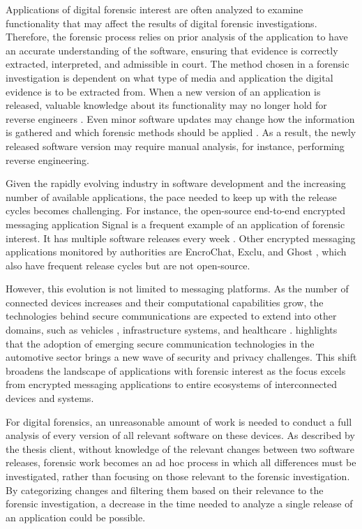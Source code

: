 Applications of digital forensic interest are often analyzed to examine functionality that may affect the results of digital forensic investigations. Therefore, the forensic process relies on prior analysis of the application to have an accurate understanding of the software, ensuring that evidence is correctly extracted, interpreted, and admissible in court. The method chosen in a forensic investigation is dependent on what type of media and application the digital evidence is to be extracted from. When a new version of an application is released, valuable knowledge about its functionality may no longer hold for reverse engineers \cite{android_matching}. Even minor software updates may change how the information is gathered and which forensic methods should be applied \cite{acm_fingerprinting_survey, nij2004forensic}. As a result, the newly released software version may require manual analysis, for instance, performing reverse engineering.

Given the rapidly evolving industry in software development and the increasing number of available applications, the pace needed to keep up with the release cycles becomes challenging. For instance, the open-source end-to-end encrypted messaging application Signal is a frequent example of an application of forensic interest. It has multiple software releases every week \cite{githubSignal}. Other encrypted messaging applications monitored by authorities are EncroChat, Exclu, and Ghost \cite{europaInternationalOperation}, which also have frequent release cycles but are not open-source.

However, this evolution is not limited to messaging platforms. As the number of connected devices increases and their computational capabilities grow, the technologies behind secure communications are expected to extend into other domains, such as vehicles \cite{gurtov_1}, infrastructure systems, and healthcare \cite{gurtov_2}. \textcite{gurtov_1} highlights that the adoption of emerging secure communication technologies in the automotive sector brings a new wave of security and privacy challenges. This shift broadens the landscape of applications with forensic interest as the focus excels from encrypted messaging applications to entire ecosystems of interconnected devices and systems.

For digital forensics, an unreasonable amount of work is needed to conduct a full analysis of every version of all relevant software on these devices. As described by the thesis client, without knowledge of the relevant changes between two software releases, forensic work becomes an ad hoc process in which all differences must be investigated, rather than focusing on those relevant to the forensic investigation. By categorizing changes and filtering them based on their relevance to the forensic investigation, a decrease in the time needed to analyze a single release of an application could be possible.

